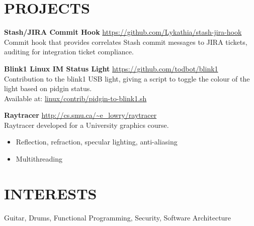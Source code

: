 \documentclass[line,margin]{res}
\begin{document}
\begin{resume}
\section{PROJECTS}
\textbf{Stash/JIRA Commit Hook} \hfill \url{https://github.com/Lykathia/stash-jira-hook} \\
Commit hook that provides correlates Stash commit messages to JIRA tickets, auditing for integration ticket compliance.

\textbf{Blink1 Linux IM Status Light} \hfill \url{https://github.com/todbot/blink1} \\
Contribution to the blink1 USB light, giving a script to toggle the colour of the light based on pidgin status. \\
Available at: \href{https://github.com/todbot/blink1/blob/master/linux/contrib/pidgin-to-blink1.sh}{linux/contrib/pidgin-to-blink1.sh}

\textbf{Raytracer} \hfill \url{http://cs.smu.ca/~e_lowry/raytracer} \\
Raytracer developed for a University graphics course.
\begin{itemize} \itemsep-2pt
    \item Reflection, refraction, specular lighting, anti-aliasing
    \item Multithreading
\end{itemize}

\section{INTERESTS}
Guitar, Drums, Functional Programming, Security, Software Architecture

\end{resume}
\end{document}

